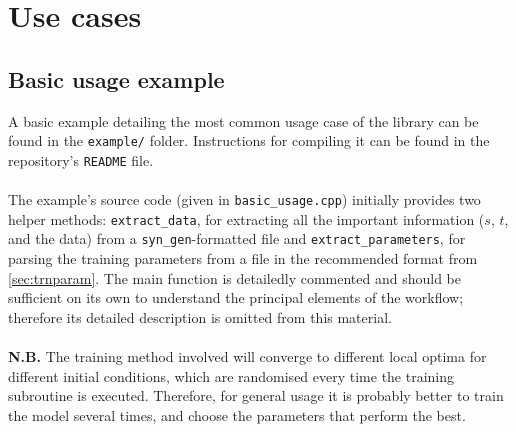 \documentclass[12pt]{article}
\begin{document}
	\section{Use cases}
	\subsection{Basic usage example}\label{sec:basic}
	A basic example detailing the most common usage case of the library can be found in the {\tt example/} folder. Instructions for compiling it can be found in the repository's {\tt README} file.\\ \\ 
	The example's source code (given in {\tt basic\_usage.cpp}) initially provides two helper methods: {\tt extract\_data}, for extracting all the important information ($s$, $t$, and the data) from a {\tt syn\_gen}-formatted file and {\tt extract\_parameters}, for parsing the training parameters from a file in the recommended format from \cref{sec:trnparam}. The main function is detailedly commented and should be sufficient on its own to understand the principal elements of the workflow; therefore its detailed description is omitted from this material.\\ \\
	{\bf N.B.} The training method involved will converge to different local optima for different initial conditions, which are randomised every time the training subroutine is executed. Therefore, for general usage it is probably better to train the model several times, and choose the parameters that perform the best.
\end{document}
